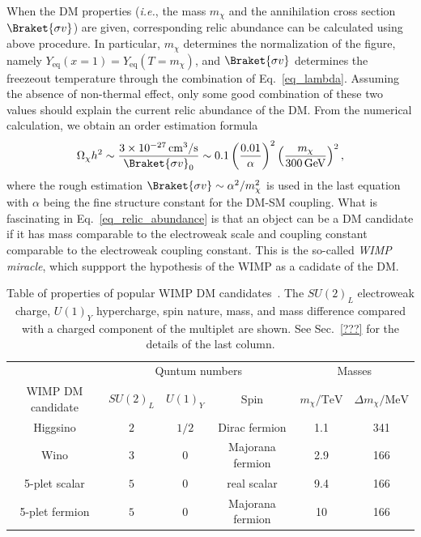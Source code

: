 \documentclass[12pt,twoside,book]{article}
\begin{document}
When the DM properties (\textit{i.e.}, the mass $m_\chi$ and the
annihilation cross section $\Braket{\sigma v}$) are given,
corresponding relic abundance can be calculated using above procedure.
In particular, $m_\chi$ determines the normalization of the figure,
namely $Y_{\mathrm{eq}} (x=1) = Y_{\mathrm{eq}} (T=m_\chi)$, and
$\Braket{\sigma v}$ determines the freezeout temperature through the
combination of Eq.~\eqref{eq_lambda}.  Assuming the absence of
non-thermal effect, only some good combination of these two values
should explain the current relic abundance of the DM.  From the
numerical calculation, we obtain an order estimation formula
\begin{align}
 \Omega_\chi h^2 \sim \frac{3 \times 10^{-27}\,\mathrm{cm^3}/\mathrm{s}}
 {\Braket{\sigma v}_0} \sim
 0.1 \left( \frac{0.01}{\alpha} \right)^2
 \left( \frac{m_\chi}{300\,\mathrm{GeV}} \right)^2,\label{eq_relic_abundance}
\end{align}
where the rough estimation $\Braket{\sigma v} \sim \alpha^2/m_\chi^2$ is
used in the last equation with $\alpha$ being the fine structure
constant for the DM-SM coupling.  What is fascinating in
Eq.~\eqref{eq_relic_abundance} is that an object can be a DM candidate
if it has mass comparable to the electroweak scale and coupling constant
comparable to the electroweak coupling constant.  This is the so-called
\textit{WIMP miracle}, which suppport the hypothesis of the WIMP as a
cadidate of the DM.

\begin{table}
 \centering
 \begin{tabular}{c|ccc|cc}
  & \multicolumn{3}{c|}{Quntum numbers} & \multicolumn{2}{c}{Masses}\\
  WIMP DM candidate & $SU(2)_L$ & $U(1)_Y$ & Spin & $m_\chi / \mathrm{TeV}$ &
  $\Delta m_\chi / \mathrm{MeV}$ \\
  \hline
  Higgsino & $2$ & $1/2$ & Dirac fermion & 1.1 & 341 \\
  Wino & $3$ & $0$ & Majorana fermion & 2.9 & 166 \\
  5-plet scalar & $5$ & $0$ & real scalar & 9.4 & 166 \\
  5-plet fermion & $5$ & $0$ & Majorana fermion & 10 & 166
 \end{tabular}
 \caption{Table of properties of popular WIMP DM
 candidates~\cite{Farina:2013mla, ArkaniHamed:2006mb, Hisano:2006nn,
 Cirelli:2007xd, Moroi:2013sla, Beneke:2016ync}.  The $SU(2)_L$
 electroweak charge, $U(1)_Y$ hypercharge, spin nature, mass, and mass
 difference compared with a charged component of the multiplet are
 shown.  See Sec.~\ref{???}   for the details of the last
 column.}  \label{tab_WIMP_property}
\end{table}
\end{document}
